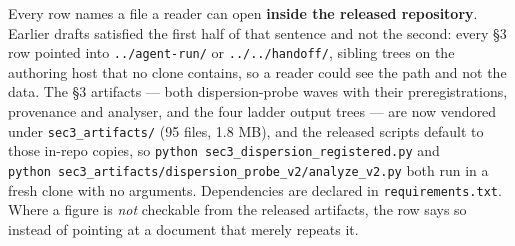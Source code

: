 Every row names a file a reader can open \textbf{inside the released repository}. Earlier drafts satisfied the first half of that sentence and not the second: every §3 row pointed into \texttt{../agent-run/} or \texttt{../../handoff/}, sibling trees on the authoring host that no clone contains, so a reader could see the path and not the data. The §3 artifacts --- both dispersion-probe waves with their preregistrations, provenance and analyser, and the four ladder output trees --- are now vendored under \texttt{sec3\_artifacts/} (95 files, 1.8 MB), and the released scripts default to those in-repo copies, so \texttt{python\ sec3\_dispersion\_registered.py} and \texttt{python\ sec3\_\allowbreak artifacts/\allowbreak dispersion\_\allowbreak probe\_\allowbreak v2/\allowbreak analyze\_\allowbreak v2.py} both run in a fresh clone with no arguments. Dependencies are declared in \texttt{requirements.txt}. Where a figure is \emph{not} checkable from the released artifacts, the row says so instead of pointing at a document that merely repeats it.

